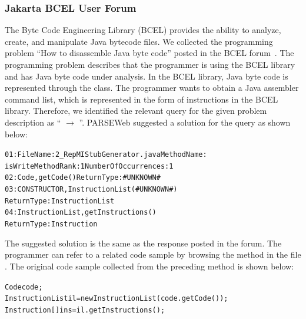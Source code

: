 \subsubsection{Jakarta BCEL User Forum}

The Byte Code Engineering Library (BCEL) provides the ability to
analyze, create, and manipulate Java bytecode files. We collected the
programming problem ``How to disassemble Java byte code'' posted in
the BCEL forum~\cite{BCELForum}. The programming problem describes
that the programmer is using the BCEL library and has Java byte code
under analysis. In the BCEL library, Java byte code is represented
through the  class. The programmer wants to obtain a
Java assembler command list, which is represented in the form of
instructions in the BCEL library. Therefore, we identified the
relevant query for the given problem description as ``
$\rightarrow$ ''. PARSEWeb suggested a solution
for the query as shown below:

\begin{CodeOut}
\begin{alltt}
01:FileName:2\_RepMIStubGenerator.java MethodName:
\hspace*{0.2in}isWriteMethod Rank:1 NumberOfOccurrences:1
02:Code,getCode() ReturnType:\#UNKNOWN\#
03:CONSTRUCTOR,InstructionList(\#UNKNOWN\#)
\hspace*{0.2in}ReturnType:InstructionList
04:InstructionList,getInstructions() 
\hspace*{0.2in}ReturnType:Instruction
\end{alltt}
\end{CodeOut}

The suggested solution is the same as the response posted in the forum. The programmer
can refer to a related code sample by browsing the  method
in the file . 
The original code sample collected from the
preceding method is shown below:

\begin{CodeOut}
\begin{alltt}
Code code;
InstructionList il = new InstructionList(code.getCode());
Instruction[] ins = il.getInstructions();
\end{alltt}
\end{CodeOut}

